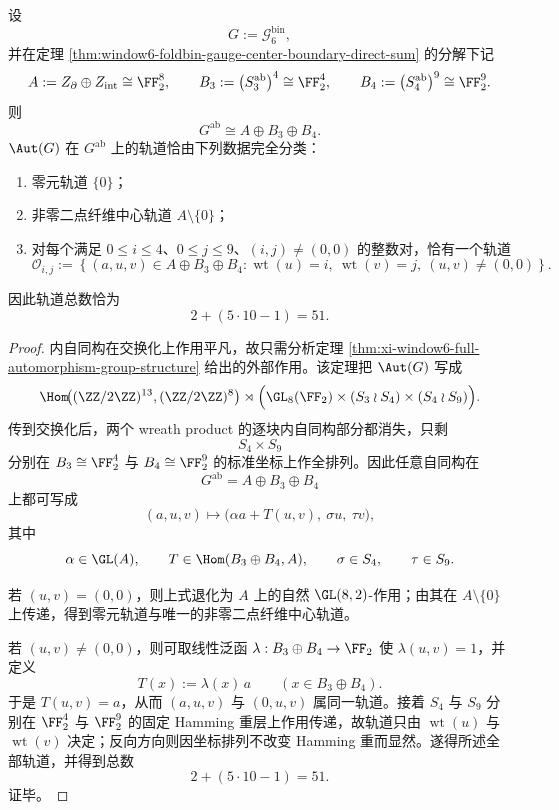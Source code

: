 \begin{theorem}\label{thm:conclusion-window6-abelianization-aut-orbits}
设
\[
G:=\mathcal G_6^{\mathrm{bin}},
\]
并在定理 \ref{thm:window6-foldbin-gauge-center-boundary-direct-sum} 的分解下记
\[
A:=Z_{\partial}\oplus Z_{\mathrm{int}}\cong \FF_2^8,
\qquad
B_3:=\bigl(S_3^{\mathrm{ab}}\bigr)^4\cong \FF_2^4,
\qquad
B_4:=\bigl(S_4^{\mathrm{ab}}\bigr)^9\cong \FF_2^9.
\]
则
\[
G^{\mathrm{ab}}\cong A\oplus B_3\oplus B_4.
\]
\(\Aut(G)\) 在 \(G^{\mathrm{ab}}\) 上的轨道恰由下列数据完全分类：
\begin{enumerate}
  \item 零元轨道 \(\{0\}\)；
  \item 非零二点纤维中心轨道 \(A\setminus\{0\}\)；
  \item 对每个满足 \(0\le i\le 4\)、\(0\le j\le 9\)、\((i,j)\neq(0,0)\) 的整数对，恰有一个轨道
  \[
  \mathcal O_{i,j}
  :=
  \left\{
  (a,u,v)\in A\oplus B_3\oplus B_4:
  \operatorname{wt}(u)=i,\ \operatorname{wt}(v)=j,\ (u,v)\neq(0,0)
  \right\}.
  \]
\end{enumerate}
因此轨道总数恰为
\[
2+(5\cdot 10-1)=51.
\]
\end{theorem}
\begin{proof}
内自同构在交换化上作用平凡，故只需分析定理 \ref{thm:xi-window6-full-automorphism-group-structure} 给出的外部作用。该定理把 \(\Aut(G)\) 写成
\[
\Hom\!\bigl((\ZZ/2\ZZ)^{13},(\ZZ/2\ZZ)^8\bigr)\rtimes
\Bigl(
\GL_8(\FF_2)\times (S_3\wr S_4)\times (S_4\wr S_9)
\Bigr).
\]
传到交换化后，两个 wreath product 的逐块内自同构部分都消失，只剩
\[
S_4\times S_9
\]
分别在 \(B_3\cong \FF_2^4\) 与 \(B_4\cong \FF_2^9\) 的标准坐标上作全排列。因此任意自同构在
\[
G^{\mathrm{ab}}=A\oplus B_3\oplus B_4
\]
上都可写成
\[
(a,u,v)\longmapsto \bigl(\alpha a+T(u,v),\ \sigma u,\ \tau v\bigr),
\]
其中
\[
\alpha\in \GL(A),\qquad
T\in \Hom(B_3\oplus B_4,A),\qquad
\sigma\in S_4,\qquad
\tau\in S_9.
\]

若 \((u,v)=(0,0)\)，则上式退化为 \(A\) 上的自然 \(\GL(8,2)\)-作用；由其在 \(A\setminus\{0\}\) 上传递，得到零元轨道与唯一的非零二点纤维中心轨道。

若 \((u,v)\neq(0,0)\)，则可取线性泛函 \(\lambda:B_3\oplus B_4\to \FF_2\) 使 \(\lambda(u,v)=1\)，并定义
\[
T(x):=\lambda(x)\,a\qquad (x\in B_3\oplus B_4).
\]
于是 \(T(u,v)=a\)，从而 \((a,u,v)\) 与 \((0,u,v)\) 属同一轨道。接着 \(S_4\) 与 \(S_9\) 分别在 \(\FF_2^4\) 与 \(\FF_2^9\) 的固定 Hamming 重层上作用传递，故轨道只由 \(\operatorname{wt}(u)\) 与 \(\operatorname{wt}(v)\) 决定；反向方向则因坐标排列不改变 Hamming 重而显然。遂得所述全部轨道，并得到总数
\[
2+(5\cdot 10-1)=51.
\]
证毕。
\end{proof}

